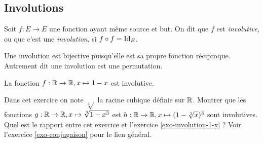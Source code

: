 \subsection{Involutions}
\begin{definition}
Soit $f : E\to E$ une fonction ayant même source et but. On dit que $f$ est \emph{involutive}, ou que c'est une \emph{involution}, si $f\circ f=\operatorname{Id}_E$.
\end{definition}

\begin{remarque}
Une involution est bijective puisqu'elle est sa propre fonction réciproque. Autrement dit une involution est une permutation.
\end{remarque}

\begin{exemple}\label{exo-involution-1-x}
La fonction $f : \mathbb{R}\to \mathbb{R}, x\mapsto 1-x$ est involutive.
\end{exemple}


\begin{exercice}\label{exo-involution-cubique}
Dans cet exercice on note $\sqrt[3]{}$ la racine cubique définie sur $\mathbb{R}$.
Montrer que les fonctions $g : \mathbb{R}\to \mathbb{R}, x\mapsto \sqrt[3]{1-x^3}$ est $h : \mathbb{R}\to \mathbb{R}, x\mapsto (1-\sqrt[3]{x})^3$ sont involutives. Quel est le rapport entre cet exercice et l'exercice \ref{exo-involution-1-x} ? Voir l'exercice \ref{exo-conjugaison} pour le lien général.

\begin{center}
\hfill
{}
\end{center}
\end{exercice}

